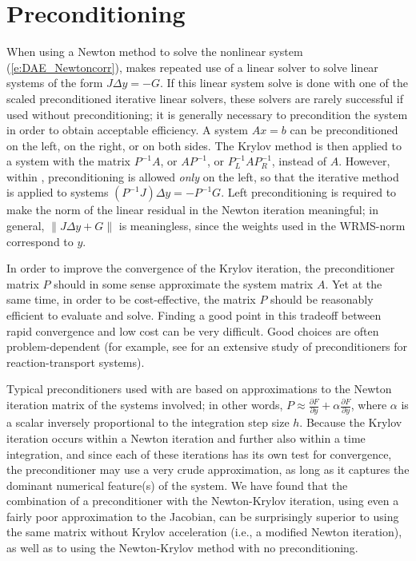 \section{Preconditioning}\label{s:preconditioning}
When using a Newton method to solve the nonlinear system (\ref{e:DAE_Newtoncorr}),
{\idas} makes repeated use of a linear solver to solve linear systems of the form
$J \Delta y = - G$.
If this linear system solve is done with one of the scaled preconditioned iterative 
linear solvers, these solvers are rarely successful if used without preconditioning;
it is generally necessary to precondition the system in order to obtain acceptable efficiency.  
A system $A x = b$ can be preconditioned on the left, on the right,
or on both sides. The Krylov method is then applied to a system with the matrix $P^{-1}A$, 
or $AP^{-1}$, or $P_L^{-1} A P_R^{-1}$, instead of $A$.  
However, within {\idas}, preconditioning is allowed {\em only} on the left,
so that the iterative method is applied to systems $(P^{-1}J)\Delta y = -P^{-1}G$.  
Left preconditioning is required to make the norm of the linear residual in the Newton 
iteration meaningful; in general, $\| J \Delta y + G \|$ is meaningless, since the 
weights used in the WRMS-norm correspond to $y$.

In order to improve the convergence of the Krylov iteration, the preconditioner matrix 
$P$ should in some sense approximate the system matrix $A$.  
Yet at the same time, in order to be cost-effective, the matrix $P$ should
be reasonably efficient to evaluate and solve.  Finding a good point
in this tradeoff between rapid convergence and low cost can be very
difficult.  Good choices are often problem-dependent (for example, see
\cite{BrHi:89} for an extensive study of preconditioners for
reaction-transport systems).

Typical preconditioners used with {\idas} are based on approximations to the Newton 
iteration matrix of the systems involved; in other words, 
$P \approx \frac{\partial F}{\partial y} + \alpha\frac{\partial F}{\partial \dot y}$,
where $\alpha$ is a scalar inversely proportional to the integration step size $h$.
Because the Krylov iteration occurs within a Newton iteration and further
also within a time integration, and since each of these iterations has
its own test for convergence, the preconditioner may use a very crude
approximation, as long as it captures the dominant numerical
feature(s) of the system.  We have found that the combination of a
preconditioner with the Newton-Krylov iteration, using even a fairly
poor approximation to the Jacobian, can be surprisingly superior to
using the same matrix without Krylov acceleration (i.e., a modified
Newton iteration), as well as to using the Newton-Krylov method with
no preconditioning.

